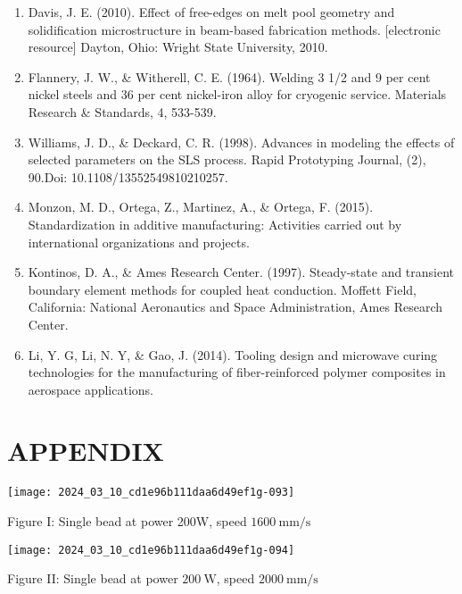 \documentclass[10pt]{article}
\begin{document}
\begin{enumerate}
  \item Davis, J. E. (2010). Effect of free-edges on melt pool geometry and solidification microstructure in beam-based fabrication methods. [electronic resource] Dayton, Ohio: Wright State University, 2010.

  \item Flannery, J. W., \& Witherell, C. E. (1964). Welding 3 1/2 and 9 per cent nickel steels and 36 per cent nickel-iron alloy for cryogenic service. Materials Research \& Standards, 4, 533-539.

  \item Williams, J. D., \& Deckard, C. R. (1998). Advances in modeling the effects of selected parameters on the SLS process. Rapid Prototyping Journal, (2), 90.Doi: 10.1108/13552549810210257.

  \item Monzon, M. D., Ortega, Z., Martinez, A., \& Ortega, F. (2015). Standardization in additive manufacturing: Activities carried out by international organizations and projects.

  \item Kontinos, D. A., \& Ames Research Center. (1997). Steady-state and transient boundary element methods for coupled heat conduction. Moffett Field, California: National Aeronautics and Space Administration, Ames Research Center.

  \item Li, Y. G, Li, N. Y, \& Gao, J. (2014). Tooling design and microwave curing technologies for the manufacturing of fiber-reinforced polymer composites in aerospace applications.

\end{enumerate}

\section*{APPENDIX}
\begin{center}
\texttt{[image: 2024\_03\_10\_cd1e96b111daa6d49ef1g-093]}
\end{center}

Figure I: Single bead at power 200W, speed $1600 \mathrm{~mm} / \mathrm{s}$

\begin{center}
\texttt{[image: 2024\_03\_10\_cd1e96b111daa6d49ef1g-094]}
\end{center}

Figure II: Single bead at power $200 \mathrm{~W}$, speed $2000 \mathrm{~mm} / \mathrm{s}$
\end{document}
